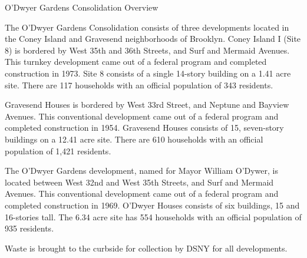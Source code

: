 O'Dwyer Gardens Consolidation Overview

The O'Dwyer Gardens Consolidation consists of three developments located in the Coney Island and Gravesend neighborhoods of Brooklyn. Coney Island I (Site 8) is bordered by West 35th and 36th Streets, and Surf and Mermaid Avenues. This turnkey development came out of a federal program and completed construction in 1973. Site 8 consists of a single 14-story building on a 1.41 acre site. There are 117 households with an official population of 343 residents.

Gravesend Houses is bordered by West 33rd Street, and Neptune and Bayview Avenues. This conventional development came out of a federal program and completed construction in 1954. Gravesend Houses consists of 15, seven-story buildings on a 12.41 acre site. There are 610 households with an official population of 1,421 residents. 

The O'Dwyer Gardens development, named for Mayor William O'Dywer, is located between West 32nd and West 35th Streets, and Surf and Mermaid Avenues. This conventional development came out of a federal program and completed construction in 1969. O'Dwyer Houses consists of six buildings, 15 and 16-stories tall. The 6.34 acre site has 554 households with an official population of 935 residents.

Waste is brought to the curbside for collection by DSNY for all developments.